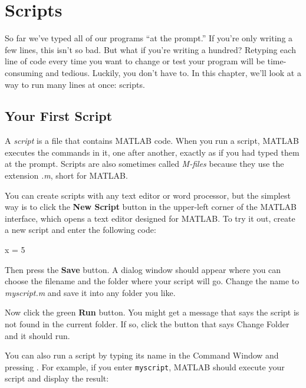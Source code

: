 \chapter{Scripts}

So far we've typed all of our programs ``at the prompt.'' If you're only writing a few lines, this isn't so bad. But what if you're writing a hundred? Retyping each line of code every time you want to change or test your program will be time-consuming and tedious. Luckily, you don't have to. In this chapter, we'll look at a way to run many lines at once: scripts.


\section{Your First Script}

A \emph{script} is a file that contains MATLAB code. When you run a script, MATLAB executes the commands in it, one after another, exactly as if you had typed them at the prompt. Scripts are
also sometimes called \emph{M-files} because they use the extension \emph{.m}, short for MATLAB. 


You can create scripts with any text editor or word processor, but the simplest way is to click the \textbf{New Script} button in the upper-left corner of the MATLAB interface, which opens a text editor designed for MATLAB.
\newpage
To try it out, create a new script and enter the following code:

\begin{code}
x = 5
\end{code}

Then press the \textbf{Save} button.  A dialog window should appear where you can choose the filename and the folder where your script will go.  
Change the name to \emph{myscript.m} and save it into any folder you like.

Now click the green \textbf{Run} button.  You might get a message that says the script is not found in the current folder.  
If so, click the button that says Change Folder and it should run.


You can also run a script by typing its name in the Command Window and pressing . For example, if you enter \lstinline{myscript}, MATLAB should execute your script and display the result:

